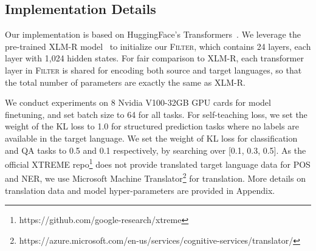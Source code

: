 \subsection{Implementation Details}

Our implementation is based on HuggingFace's Transformers~\cite{Wolf2019HuggingFacesTS}.
We leverage the pre-trained XLM-R model~\cite{conneau2019unsupervised} to initialize our \textsc{Filter}, which contains 24 layers, each layer with 1,024 hidden states. For fair comparison to XLM-R, each transformer layer in \textsc{Filter} is shared for encoding both source and target languages, so that the total number of parameters are exactly the same as XLM-R.

We conduct experiments on 8 Nvidia V100-32GB GPU cards for model finetuning, and set batch size to 64 for all tasks. 
For self-teaching loss, we set the weight of the KL loss to 1.0 for structured prediction tasks where no labels are available in the target language.
We set the weight of KL loss for classification and QA tasks to 0.5 and 0.1 respectively, by searching over [0.1, 0.3, 0.5]. 
As the official XTREME repo\footnote{https://github.com/google-research/xtreme} does not provide translated target language data for POS and NER,
we use Microsoft Machine Translator\footnote{https://azure.microsoft.com/en-us/services/cognitive-services/translator/} for translation.
More details on translation data and model hyper-parameters are provided in Appendix.




